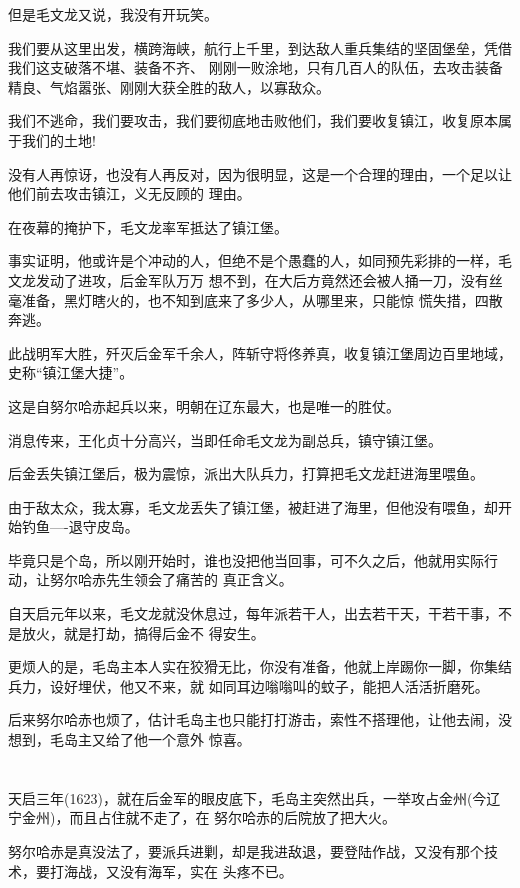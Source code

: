\documentclass[11pt,a4paper,onecolumn]{article}
\begin{document}
但是毛文龙又说，我没有开玩笑。

我们要从这里出发，横跨海峡，航行上千里，到达敌人重兵集结的坚固堡垒，凭借我们这支破落不堪、装备不齐、
刚刚一败涂地，只有几百人的队伍，去攻击装备精良、气焰嚣张、刚刚大获全胜的敌人，以寡敌众。

我们不逃命，我们要攻击，我们要彻底地击败他们，我们要收复镇江，收复原本属于我们的土地!

没有人再惊讶，也没有人再反对，因为很明显，这是一个合理的理由，一个足以让他们前去攻击镇江，义无反顾的
理由。

在夜幕的掩护下，毛文龙率军抵达了镇江堡。

事实证明，他或许是个冲动的人，但绝不是个愚蠢的人，如同预先彩排的一样，毛文龙发动了进攻，后金军队万万
想不到，在大后方竟然还会被人捅一刀，没有丝毫准备，黑灯瞎火的，也不知到底来了多少人，从哪里来，只能惊
慌失措，四散奔逃。

此战明军大胜，歼灭后金军千余人，阵斩守将佟养真，收复镇江堡周边百里地域，史称``镇江堡大捷''。

这是自努尔哈赤起兵以来，明朝在辽东最大，也是唯一的胜仗。

消息传来，王化贞十分高兴，当即任命毛文龙为副总兵，镇守镇江堡。

后金丢失镇江堡后，极为震惊，派出大队兵力，打算把毛文龙赶进海里喂鱼。

由于敌太众，我太寡，毛文龙丢失了镇江堡，被赶进了海里，但他没有喂鱼，却开始钓鱼----退守皮岛。

毕竟只是个岛，所以刚开始时，谁也没把他当回事，可不久之后，他就用实际行动，让努尔哈赤先生领会了痛苦的
真正含义。

自天启元年以来，毛文龙就没休息过，每年派若干人，出去若干天，干若干事，不是放火，就是打劫，搞得后金不
得安生。

更烦人的是，毛岛主本人实在狡猾无比，你没有准备，他就上岸踢你一脚，你集结兵力，设好埋伏，他又不来，就
如同耳边嗡嗡叫的蚊子，能把人活活折磨死。

后来努尔哈赤也烦了，估计毛岛主也只能打打游击，索性不搭理他，让他去闹，没想到，毛岛主又给了他一个意外
惊喜。

\section[\thesection]{}

天启三年(1623)，就在后金军的眼皮底下，毛岛主突然出兵，一举攻占金州(今辽宁金州)，而且占住就不走了，在
努尔哈赤的后院放了把大火。

努尔哈赤是真没法了，要派兵进剿，却是我进敌退，要登陆作战，又没有那个技术，要打海战，又没有海军，实在
头疼不已。
\end{document}
